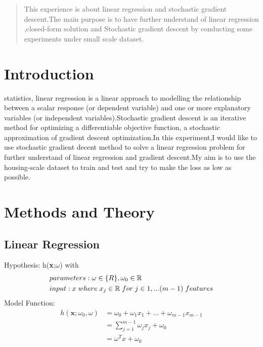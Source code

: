 \documentclass[journal, a4paper]{IEEEtran}
\begin{document}
\begin{abstract}
This experience is about linear regression and stochastic gradient descent.The main purpose is to have further understand of linear regression ,closed-form solution and Stochastic gradient descent by conducting some experiments under small scale dataset.
\end{abstract}

\section{Introduction}
 statistics, linear regression is a linear approach to modelling the relationship between a scalar response (or dependent variable) and one or more explanatory variables (or independent variables).Stochastic gradient descent is an iterative method for optimizing a differentiable objective function, a stochastic approximation of gradient descent optimization.In this experiment,I would like to use stochastic gradient decent method to solve a linear regression problem for further understand of linear regression and gradient descent.My aim is to use the housing-scale dataset to train and test and try to make the loss as low as possible. 

\section{Methods and Theory}
\subsection{Linear Regression}
Hypothesis: h(\textbf{x};\textbf{$\omega$})  with
\begin{align*}
&parameters: \omega \in \mathbb\{R\} , \omega_{0} \in  \mathbb{R}\\
&input: x\;where\;x_{j} \in\mathbb{R}\;for\;j\in 1,...(m-1)\;features
\end{align*}
		Model Function:
\begin{equation}
\begin{aligned}
h(\textbf{x};\omega_{0},\omega)&=\omega_{0}+\omega_{1}x_{1}+...+\omega_{m-1}x_{m-1}\\&=\sum_{j=1}^{m-1} \omega_{j}x_{j}+\omega_{0}\\&=\omega^{T}x+\omega_{0}\\
\end{aligned}
\end{equation}
\end{document}
